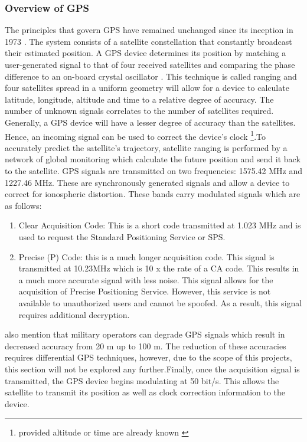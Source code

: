 \subsubsection{Overview of GPS}

The principles that govern GPS have remained unchanged since its inception in 1973 \cite{spilker1996global}. The system consists of a satellite constellation that constantly broadcast their estimated position. A GPS device determines its position by matching a user-generated signal to that of four received satellites and comparing the phase difference to an on-board crystal oscillator \cite{spilker1996global}. This technique is called ranging and four satellites spread in a uniform geometry will allow for a device to calculate latitude, longitude, altitude and time to a relative degree of accuracy. The number of unknown signals correlates to the number of satellites required. Generally, a GPS device will have a lesser degree of accuracy than the satellites. Hence, an incoming signal can be used to correct the device's clock \footnote{provided altitude or time are already known \cite{spilker1996global}}.To accurately predict the satellite's trajectory, satellite ranging is performed by a network of global monitoring which calculate the future position and send it back to the satellite. GPS signals are transmitted on two frequencies: 1575.42 MHz and 1227.46 MHz\cite{spilker1996global}. These are synchronously generated signals and allow a device to correct for ionospheric distortion. These bands carry modulated signals which are as follows: \cite{spilker1996global}


\begin{enumerate}
	\item Clear Acquisition Code:  This is a short code transmitted at 1.023 MHz and is used to request the Standard Positioning Service or SPS.
	\item Precise (P) Code: this is a much longer acquisition code. This signal is transmitted at 10.23MHz which is 10 x the rate of a CA code. This results in a much more accurate signal with less noise. This signal allows for the acquisition of Precise Positioning Service. However, this service is not available to unauthorized users and cannot be spoofed. As a result, this signal requires additional decryption.    
\end{enumerate}

\textcite{spilker1996global} also mention that military operators can degrade GPS signals which result in decreased accuracy from 20 m up to 100 m. The reduction of these accuracies requires differential GPS techniques, however, due to the scope of this projects, this section will not be explored any further.Finally, once the acquisition signal is transmitted, the GPS device begins modulating at 50 bit/s. This allows the satellite to transmit its position as well as clock correction information to the device.\par

